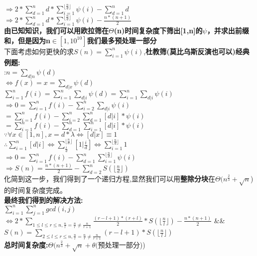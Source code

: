 \documentclass[UTF8]{ctexart}
\begin{document}
\\$\Rightarrow 2*\sum\limits_{d=1}^n d*\sum\limits_{i=1}^{\lfloor\frac{n}{d}\rfloor}\psi(i)-\sum\limits_{d=1}^n d$
\\$\Rightarrow 2*\sum\limits_{d=1}^n d*\sum\limits_{i=1}^{\lfloor\frac{n}{d}\rfloor}\psi(i)-\frac{n*(n+1)}{2}$
\\\indent\textbf{由已知知识，我们可以用欧拉筛在$\Theta$(n)时间复杂度下筛出[1,n]的$\psi$，并求出前缀和，但是因为n$\in[1,10^{10}]$我们最多预处理一部分}
\\下面考虑如何更快的求$S(n)=\sum\limits_{i=1}^n \psi(i)$,\textbf{杜教筛(莫比乌斯反演也可以)经典例题:}
\\:$n=\sum\limits_{d|n} \psi(d)$
\\$\Leftrightarrow f(x)=x=\sum\limits_{d|x} \psi(d)$
\\$\sum\limits_{i=1}^n f(i)=\sum\limits_{i=1}^n\sum\limits_{d|i} \psi(d)=\sum\limits_{i=1}^n\sum\limits_{d|i}\psi(i)$
\\$\Rightarrow 0=\sum\limits_{i=1}^n f(i)-\sum\limits_{i=2}^n\sum\limits_{d|i}\psi(i)$
\\\indent$=\sum\limits_{i=1}^n f(i)-\sum\limits_{i=2}^n\sum\limits_{d=1}^n [d|i]*\psi(i)$
\\\indent$=\sum\limits_{i=1}^n f(i)-\sum\limits_{d=1}^n\sum\limits_{i=1}^n [d|i]*\psi(i)$
\\\indent$\because \forall x\in[1,n],x=d*\lambda\Leftrightarrow[d|x]\equiv1$
\\\indent$\therefore \sum\limits_{i=1}^n [d|i]\Leftrightarrow\sum\limits_{\frac{i}{d}}^{\lfloor\frac{n}{d}\rfloor} [1|\frac{i}{d}]\Leftrightarrow\sum\limits_{i=1}^{\lfloor\frac{n}{d}\rfloor}1$
\\$\Rightarrow 0=\sum_{i=1}^n f(i)-\sum\limits_{d=1}^n\sum\limits_{i=1}^{\lfloor\frac{n}{d}\rfloor}\psi(i)$
\\$\Rightarrow S(n)=\frac{n*(n+1)}{2}-\sum\limits_{d=2}^n S(\lfloor\frac{n}{d}\rfloor)$
\\化简到这一步，我们得到了一个递归方程,显然我们可以用\textbf{整除分块}在$\Theta(n^{\frac{2}{3}}+\sqrt{n}$)的时间复杂度完成。
\\\textbf{最终我们得到的解决方法:}
\\$\sum_{i=1}^n\sum_{j=1}^n gcd(i,j)$
\\$\Leftrightarrow 2*\sum\limits_{1\leq l\leq r\leq n,\frac{n}{l}=\frac{n}{r}\neq\frac{n}{r+1}}\frac{(r-l+1)*(r+l)}{2}*S(\lfloor\frac{n}{l}\rfloor)-\frac{n*(n+1)}{2}$ \&\& $S(n)=\sum\limits_{2\leq l\leq r\leq n,\frac{n}{l}=\frac{n}{r}\neq\frac{n}{r+1}} (r-l+1)*S(\lfloor\frac{n}{l}\rfloor)$
\\\textbf{总时间复杂度:}$\Theta(n^{\frac{2}{3}}+\sqrt{n}+\theta($预处理一部分))
\end{document}
